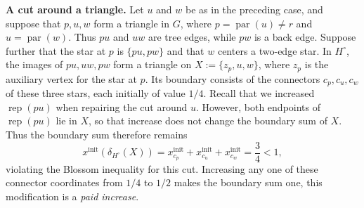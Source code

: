 \documentclass[11pt]{amsart}
\newcommand{\rep}[1]{\operatorname{rep}(#1)}
\newcommand{\1}{\mathbbm{1}}
\begin{document}
\smallskip\noindent\textbf{A cut around a triangle.}
{Let $u$ and $w$ be as in the preceding case,
and suppose that $p,u,w$ form a triangle in $G$, where
$p=\operatorname{par}(u)\ne r$ and $u=\operatorname{par}(w)$.
Thus $pu$ and $uw$ are tree edges, while $pw$ is a back edge.
Suppose further that the star at $p$ is $\{pu,pw\}$ and that
$w$ centers a two-edge star.
In $H^\circ$, the images of $pu,uw,pw$ form a triangle
on $X:=\{z_p,u,w\}$, where $z_p$ is the auxiliary vertex
for the star at $p$. Its boundary consists of the connectors $c_p,c_u,c_w$
of these three stars, each initially of value $1/4$.
Recall that we increased $\rep{pu}$ when repairing the cut
around $u$. However, both endpoints of $\rep{pu}$ lie in $X$,
so that increase does not change the boundary sum of $X$. Thus the boundary sum therefore remains
\[
 x^{\mathrm{init}}(\delta_{H^\circ}(X))
 =x^{\mathrm{init}}_{c_p}
  +x^{\mathrm{init}}_{c_u}
  +x^{\mathrm{init}}_{c_w}
 =\frac34<1,
\]
violating the Blossom inequality for this cut.
Increasing any one of these connector coordinates from $1/4$
to $1/2$ makes the boundary sum one, this modification is a
\textit{paid increase}.}
\end{document}
